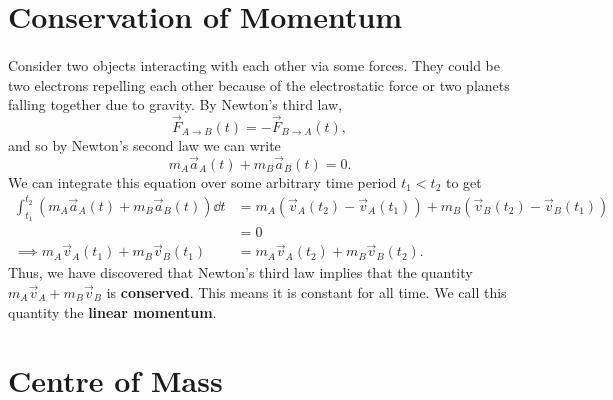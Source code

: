 \documentclass[../classical_mechanics.tex]{subfiles}
\begin{document}
    \section{Conservation of Momentum}
        \paragraph{}
        Consider two objects interacting with each other via some forces.
        They could be two electrons repelling each other because of the electrostatic force or two planets falling together due to gravity.
        By Newton's third law,
        \begin{equation}
            \vec{F}_{A\to B}(t)=-\vec{F}_{B\to A}(t),
        \end{equation}
        and so by Newton's second law we can write
        \begin{equation}\label{eq-COM-acc}
            m_A\vec{a}_A(t)+m_B\vec{a}_B(t)=0.
        \end{equation}
        We can integrate this equation over some arbitrary time period $t_1<t_2$ to get
        \begin{align}
            \int_{t_1}^{t_2}\left(m_A\vec{a}_A(t)+m_B\vec{a}_B(t)\right)\dd{t}&=m_A\left(\vec{v}_A(t_2)-\vec{v}_A(t_1)\right)+m_B\left(\vec{v}_B(t_2)-\vec{v}_B(t_1)\right)\\
            &=0\\
            \implies m_A\vec{v}_A(t_1)+m_B\vec{v}_B(t_1)&=m_A\vec{v}_A(t_2)+m_B\vec{v}_B(t_2).
        \end{align}
        Thus, we have discovered that Newton's third law implies that the quantity $m_A\vec{v}_A+m_B\vec{v}_B$ is \textbf{conserved}.
        This means it is constant for all time. We call this quantity the \textbf{linear momentum}.

    \section{Centre of Mass}
\end{document}

